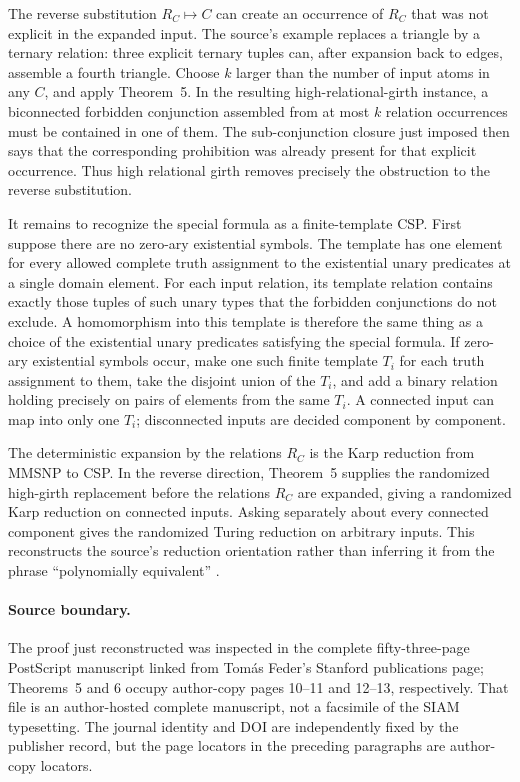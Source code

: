 The reverse substitution \(R_C\mapsto C\) can create an occurrence of
\(R_C\) that was not explicit in the expanded input.  The source's example
replaces a triangle by a ternary relation: three explicit ternary tuples can,
after expansion back to edges, assemble a fourth triangle.  Choose \(k\)
larger than the number of input atoms in any \(C\), and apply Theorem~5.
In the resulting high-relational-girth instance, a biconnected forbidden
conjunction assembled from at most \(k\) relation occurrences must be
contained in one of them.  The sub-conjunction closure just imposed then says
that the corresponding prohibition was already present for that explicit
occurrence.  Thus high relational girth removes precisely the obstruction to
the reverse substitution.

It remains to recognize the special formula as a finite-template CSP.  First
suppose there are no zero-ary existential symbols.  The template has one
element for every allowed complete truth assignment to the existential unary
predicates at a single domain element.  For each input relation, its template
relation contains exactly those tuples of such unary types that the forbidden
conjunctions do not exclude.  A homomorphism into this template is therefore
the same thing as a choice of the existential unary predicates satisfying the
special formula.  If zero-ary existential symbols occur, make one such finite
template \(T_i\) for each truth assignment to them, take the disjoint union
of the \(T_i\), and add a binary relation holding precisely on pairs of
elements from the same \(T_i\).  A connected input can map into only one
\(T_i\); disconnected inputs are decided component by component.

The deterministic expansion by the relations \(R_C\) is the Karp reduction
from MMSNP to CSP.  In the reverse direction, Theorem~5 supplies the randomized
high-girth replacement before the relations \(R_C\) are expanded, giving a
randomized Karp reduction on connected inputs.  Asking separately about every
connected component gives the randomized Turing reduction on arbitrary
inputs.  This reconstructs the source's reduction orientation rather than
inferring it from the phrase ``polynomially equivalent''
\cite[author-copy pp.~12--13, thm.~6]{FederVardi1998}.

\paragraph{Source boundary.}
The proof just reconstructed was inspected in the complete fifty-three-page
PostScript manuscript linked from Tom\'as Feder's Stanford publications page;
Theorems~5 and 6 occupy author-copy pages 10--11 and 12--13, respectively.
That file is an author-hosted complete manuscript, not a facsimile of the
SIAM typesetting.  The journal identity and DOI are independently fixed by
the publisher record, but the page locators in the preceding paragraphs are
author-copy locators.

